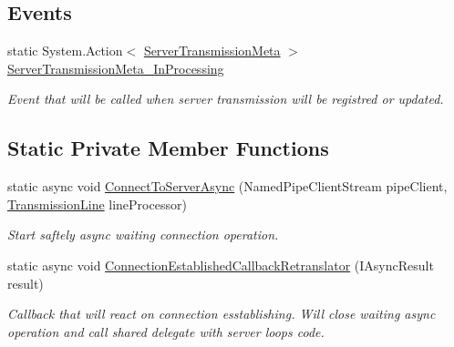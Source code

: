 \subsection*{Events}
\begin{DoxyCompactItemize}
\item 
static System.\+Action$<$ \mbox{\hyperlink{class_pipes_provider_1_1_server_transmission_meta}{Server\+Transmission\+Meta}} $>$ \mbox{\hyperlink{class_pipes_provider_1_1_a_p_i_a88d536e98d1ea1c34d4331fef67a7561}{Server\+Transmission\+Meta\+\_\+\+In\+Processing}}
\begin{DoxyCompactList}\small\item\em Event that will be called when server transmission will be registred or updated. \end{DoxyCompactList}\end{DoxyCompactItemize}
\subsection*{Static Private Member Functions}
\begin{DoxyCompactItemize}
\item 
static async void \mbox{\hyperlink{class_pipes_provider_1_1_a_p_i_a5314727d43f5fafc8630dbc814cebeac}{Connect\+To\+Server\+Async}} (Named\+Pipe\+Client\+Stream pipe\+Client, \mbox{\hyperlink{class_pipes_provider_1_1_transmission_line}{Transmission\+Line}} line\+Processor)
\begin{DoxyCompactList}\small\item\em Start saftely async waiting connection operation. \end{DoxyCompactList}\item 
static async void \mbox{\hyperlink{class_pipes_provider_1_1_a_p_i_a0feeed2f76dc4292c3b85fdd054bd77e}{Connection\+Established\+Callback\+Retranslator}} (I\+Async\+Result result)
\begin{DoxyCompactList}\small\item\em Callback that will react on connection esstablishing. Will close waiting async operation and call shared delegate with server loop\textquotesingle{}s code. \end{DoxyCompactList}\end{DoxyCompactItemize}
